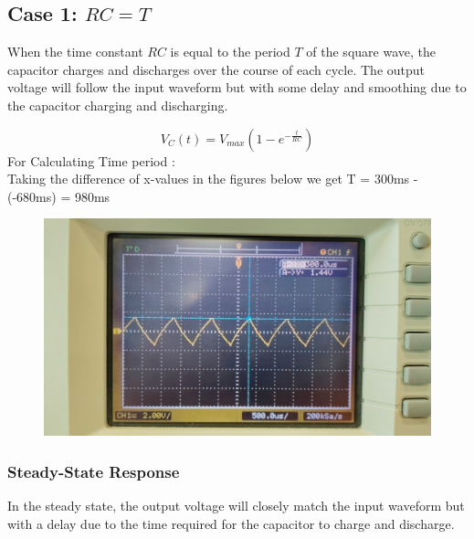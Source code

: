 \documentclass[a4paper,12pt]{article}
\begin{document}
\subsection*{Case 1: \( RC = T \)}
When the time constant \( RC \) is equal to the period \( T \) of the square wave, the capacitor charges and discharges over the course of each cycle. The output voltage will follow the input waveform but with some delay and smoothing due to the capacitor charging and discharging.

\[
V_C(t) = V_{max} \left( 1 - e^{-\frac{t}{RC}} \right)
\]
For Calculating Time period :\\
Taking the difference of x-values in the figures below we get T = 300ms - (-680ms) = 980ms
\begin{figure}[H]
    \centering
    \includegraphics[width=\textwidth]{figs/rc=t_Time.jpeg}
\end{figure}

\subsubsection*{Steady-State Response}
In the steady state, the output voltage will closely match the input waveform but with a delay due to the time required for the capacitor to charge and discharge.
\end{document}
